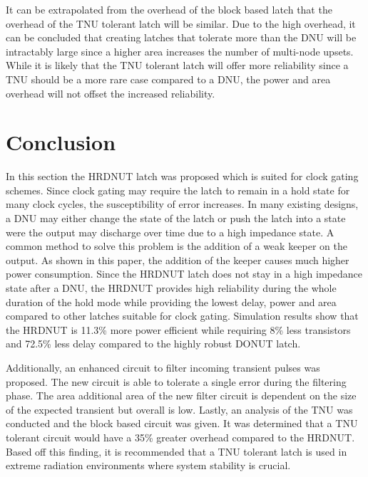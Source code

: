 It can be extrapolated from the overhead of the block based latch that the overhead of the TNU tolerant latch will be similar. Due to the high overhead, it can be concluded that creating latches that tolerate more than the DNU will be intractably large since a higher area increases the number of multi-node upsets. While it is likely that the TNU tolerant latch will offer more reliability since a TNU should be a more rare case compared to a DNU, the power and area overhead will not offset the increased reliability. 

\section{Conclusion} \label{sec:conc}
In this section the HRDNUT latch was proposed which is suited for clock gating schemes. Since clock gating may require the latch to remain in a hold state for many clock cycles, the susceptibility of error increases. In many existing designs, a DNU may either change the state of the latch or push the latch into a state were the output may discharge over time due to a high impedance state. A common method to solve this problem is the addition of a weak keeper on the output. As shown in this paper, the addition of the keeper causes much higher power consumption. Since the HRDNUT latch does not stay in a high impedance state after a DNU, the HRDNUT provides high reliability during the whole duration of the hold mode while providing the lowest delay, power and area compared to other latches suitable for clock gating. Simulation results show that the HRDNUT is 11.3\% more power efficient while requiring 8\% less transistors and 72.5\% less delay compared to the highly robust DONUT latch. 

Additionally, an enhanced circuit to filter incoming transient pulses was proposed. The new circuit is able to tolerate a single error during the filtering phase. The area additional area of the new filter circuit is dependent on the size of the expected transient but overall is low. Lastly, an analysis of the TNU was conducted and the block based circuit was given. It was determined that a TNU tolerant circuit would have a 35\% greater overhead compared to the HRDNUT. Based off this finding, it is recommended that a TNU tolerant latch is used in extreme radiation environments where system stability is crucial.